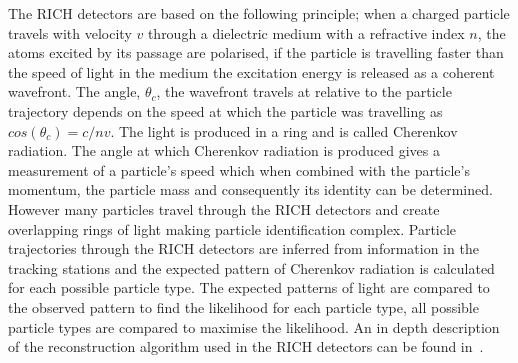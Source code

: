The RICH detectors are based on the following principle; when a charged particle travels with velocity $v$ through a dielectric medium with a refractive index $n$, the atoms excited by its passage are polarised, if the particle is travelling faster than the speed of light in the medium the excitation energy is released as a coherent wavefront. The angle, $\theta_{c}$, the wavefront travels at relative to the particle trajectory depends on the speed at which the particle was travelling as $cos(\theta_{c}) = c/nv$. The light is produced in a ring and is called Cherenkov radiation. %
The angle at which Cherenkov radiation is produced gives a measurement of a particle’s speed which when combined with the particle’s momentum, the particle mass and consequently its identity can be determined. However many particles travel through the RICH detectors and create overlapping rings of light making particle identification complex. Particle trajectories through the RICH detectors are inferred from information in the tracking stations and the expected pattern of Cherenkov radiation is calculated for each possible particle type. The expected patterns of light are compared to the observed pattern to find the likelihood for each particle type, all possible particle types are compared to maximise the likelihood. An in depth description of the reconstruction algorithm used in the RICH detectors can be found in~\cite{Forty:684714}. 


